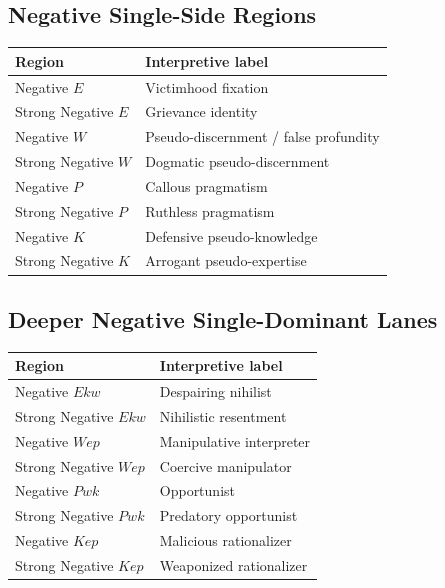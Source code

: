 \documentclass[11pt]{article}
\begin{document}
\subsection*{Negative Single-Side Regions}
\begin{center}
\begin{tabular}{>{\raggedright\arraybackslash}p{4.6cm} >{\raggedright\arraybackslash}p{8.6cm}}
\toprule
Region & Interpretive label \\
\midrule
Negative $E$ & Victimhood fixation \\
Strong Negative $E$ & Grievance identity \\
Negative $W$ & Pseudo-discernment / false profundity \\
Strong Negative $W$ & Dogmatic pseudo-discernment \\
Negative $P$ & Callous pragmatism \\
Strong Negative $P$ & Ruthless pragmatism \\
Negative $K$ & Defensive pseudo-knowledge \\
Strong Negative $K$ & Arrogant pseudo-expertise \\
\bottomrule
\end{tabular}
\end{center}

\subsection*{Deeper Negative Single-Dominant Lanes}
\begin{center}
\begin{tabular}{>{\raggedright\arraybackslash}p{5.4cm} >{\raggedright\arraybackslash}p{7.8cm}}
\toprule
Region & Interpretive label \\
\midrule
Negative $Ekw$ & Despairing nihilist \\
Strong Negative $Ekw$ & Nihilistic resentment \\
Negative $Wep$ & Manipulative interpreter \\
Strong Negative $Wep$ & Coercive manipulator \\
Negative $Pwk$ & Opportunist \\
Strong Negative $Pwk$ & Predatory opportunist \\
Negative $Kep$ & Malicious rationalizer \\
Strong Negative $Kep$ & Weaponized rationalizer \\
\bottomrule
\end{tabular}
\end{center}
\end{document}
